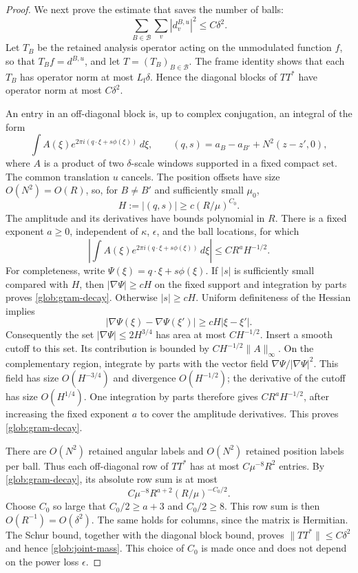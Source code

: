 \begin{proof}
We next prove the estimate that saves the number of balls:
\begin{equation}\label{glob:joint-mass}
       \sum_{B\in\mathcal B}\sum_v|d_v^{B,u}|^2
                         \le C\delta^2.
\end{equation}
Let $T_B$ be the retained analysis operator acting on the unmodulated
function $f$, so that $T_Bf=d^{B,u}$, and let $T=(T_B)_{B\in\mathcal B}$.
The frame identity shows that each $T_B$ has operator norm at most
$L_{\mathrm f}\delta$. Hence the diagonal blocks of $TT^*$ have
operator norm at most $C\delta^2$.

An entry in an off-diagonal block is, up to complex conjugation, an
integral of the form
\begin{equation}\label{glob:gram-entry}
 \int A(\xi)e^{2\pi i(q\cdot\xi+s\phi(\xi))}\,d\xi,
 \qquad
 (q,s)=a_B-a_{B'}+N^2(z-z',0),
\end{equation}
where $A$ is a product of two $\delta$-scale windows supported in a fixed
compact set. The common translation $u$ cancels. The position offsets
have size $O(N^2)=O(R)$, so, for $B\ne B'$ and sufficiently small
$\mu_0$,
\[
 H:=|(q,s)|\ge c(R/\mu)^{C_0}.
\]
The amplitude and its derivatives have bounds polynomial in $R$.
There is a fixed exponent $a\ge0$, independent of $\kappa$, $\epsilon$,
and the ball locations, for which
\begin{equation}\label{glob:gram-decay}
 \left|\int A(\xi)e^{2\pi i(q\cdot\xi+s\phi(\xi))}\,d\xi\right|
                       \le C R^aH^{-1/2}.
\end{equation}
For completeness, write $\Psi(\xi)=q\cdot\xi+s\phi(\xi)$.
If $|s|$ is sufficiently small compared with $H$, then
$|\nabla\Psi|\ge cH$ on the fixed support and integration by parts
proves \eqref{glob:gram-decay}. Otherwise $|s|\ge cH$. Uniform
definiteness of the Hessian implies
\[
 |\nabla\Psi(\xi)-\nabla\Psi(\xi')|
                         \ge cH|\xi-\xi'|.
\]
Consequently the set $|\nabla\Psi|\le2H^{3/4}$ has area at most
$CH^{-1/2}$. Insert a smooth cutoff to this set. Its contribution is
bounded by $CH^{-1/2}\|A\|_\infty$. On the complementary region,
integrate by parts with the vector field
$\nabla\Psi/|\nabla\Psi|^2$. This field has size $O(H^{-3/4})$
and divergence $O(H^{-1/2})$; the derivative of the cutoff has size
$O(H^{1/4})$. One integration by parts therefore gives
$CR^aH^{-1/2}$, after increasing the fixed exponent $a$ to cover the
amplitude derivatives. This proves \eqref{glob:gram-decay}.

There are $O(N^2)$ retained angular labels and $O(N^2)$ retained
position labels per ball. Thus each off-diagonal row of $TT^*$ has at
most $C\mu^{-8}R^2$ entries. By \eqref{glob:gram-decay}, its absolute
row sum is at most
\[
 C\mu^{-8}R^{a+2}(R/\mu)^{-C_0/2}.
\]
Choose $C_0$ so large that $C_0/2\ge a+3$ and $C_0/2\ge8$.
This row sum is then $O(R^{-1})=O(\delta^2)$. The same holds for
columns, since the matrix is Hermitian. The Schur bound, together with
the diagonal block bound, proves $\|TT^*\|\le C\delta^2$ and hence
\eqref{glob:joint-mass}. This choice of $C_0$ is made once and does
not depend on the power loss $\epsilon$.


\end{proof}
